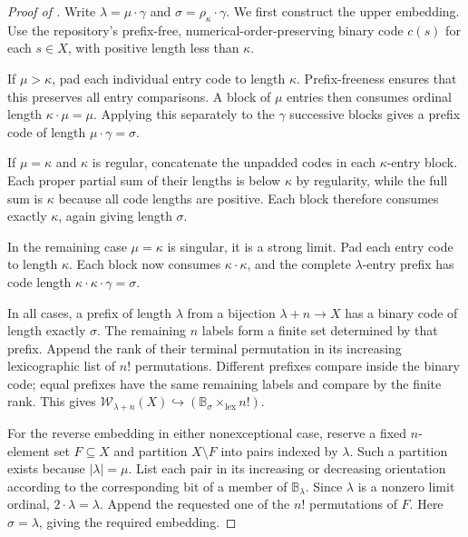\documentclass[11pt]{article}
\theoremstyle{definition}
\theoremstyle{remark}
\newcommand{\WO}{\mathcal W}
\newcommand{\B}{\mathbb B}
\newcommand{\lex}{\mathrm{lex}}
\newcommand{\emb}{\hookrightarrow}
\begin{document}
\begin{proof}[Proof of ]
Write $\lambda=\mu\cdot\gamma$ and $\sigma=\rho_\kappa\cdot\gamma$.
We first construct the upper embedding.  Use the repository's
prefix-free, numerical-order-preserving binary code $c(s)$ for each
$s\in X$, with positive length less than $\kappa$.

If $\mu>\kappa$, pad each individual entry code to length $\kappa$.
Prefix-freeness ensures that this preserves all entry comparisons.
A block of $\mu$ entries then consumes ordinal length
$\kappa\cdot\mu=\mu$.  Applying this separately to the $\gamma$
successive blocks gives a prefix code of length
$\mu\cdot\gamma=\sigma$.

If $\mu=\kappa$ and $\kappa$ is regular, concatenate the unpadded
codes in each $\kappa$-entry block.  Each proper partial sum of their
lengths is below $\kappa$ by regularity, while the full sum is
$\kappa$ because all code lengths are positive.  Each block therefore
consumes exactly $\kappa$, again giving length $\sigma$.

In the remaining case $\mu=\kappa$ is singular, it is a strong limit.
Pad each entry code to length $\kappa$.  Each block now consumes
$\kappa\cdot\kappa$, and the complete $\lambda$-entry prefix has
code length $\kappa\cdot\kappa\cdot\gamma=\sigma$.

In all cases, a prefix of length $\lambda$ from a bijection
$\lambda+n\to X$ has a binary code of length exactly $\sigma$.
The remaining $n$ labels form a finite set determined by that prefix.
Append the rank of their terminal permutation in its increasing
lexicographic list of $n!$ permutations.  Different prefixes compare
inside the binary code; equal prefixes have the same remaining labels
and compare by the finite rank.  This gives
$\WO_{\lambda+n}(X)\emb (\B_{\sigma}\times_{\lex}n!)$.

For the reverse embedding in either nonexceptional case, reserve a
fixed $n$-element set $F\subseteq X$ and partition $X\setminus F$
into pairs indexed by $\lambda$.  Such a partition exists because
$|\lambda|=\mu$.  List each pair in its increasing or decreasing
orientation according to the corresponding bit of a member of
$\B_\lambda$.  Since $\lambda$ is a nonzero limit ordinal,
$2\cdot\lambda=\lambda$.  Append the requested one of the $n!$
permutations of $F$.  Here $\sigma=\lambda$, giving the required
embedding.


\end{proof}
\end{document}
